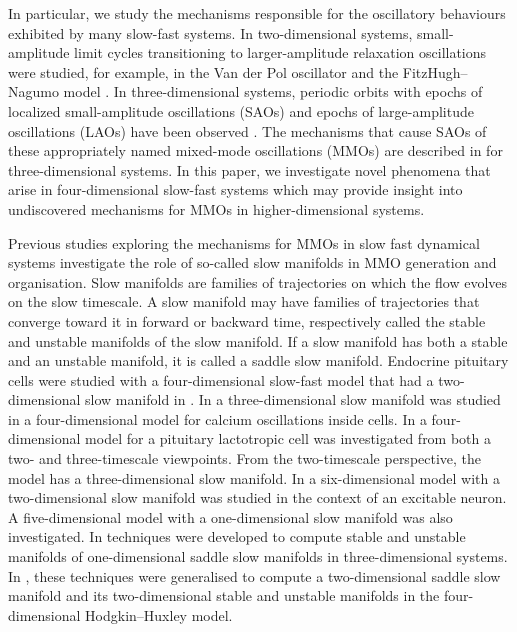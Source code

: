 \documentclass{ws-ijbc}
\begin{document}
In particular, we study the mechanisms responsible for the oscillatory behaviours exhibited by many slow-fast systems.  In two-dimensional systems, small-amplitude limit cycles transitioning to larger-amplitude relaxation oscillations were studied, for example, in the Van der Pol oscillator and the FitzHugh--Nagumo model \cite{canard_explosion, fitz-hugh-nagumo}.  In three-dimensional systems, periodic orbits with epochs of localized small-amplitude oscillations (SAOs) and epochs of large-amplitude oscillations (LAOs) have been observed \cite{BZ}.  The mechanisms that cause SAOs of these appropriately named mixed-mode oscillations (MMOs) are described in \cite{MMO} for three-dimensional systems.  In this paper, we investigate novel phenomena that arise in four-dimensional slow-fast systems which may provide insight into undiscovered mechanisms for MMOs in higher-dimensional systems.

Previous studies exploring the mechanisms for MMOs in slow fast dynamical systems investigate the role of so-called slow manifolds in MMO generation and organisation.  Slow manifolds are families of trajectories on which the flow evolves on the slow timescale.  A slow manifold may have families of trajectories that converge toward it in forward or backward time, respectively called the stable and unstable manifolds of the slow manifold.  If a slow manifold has both a stable and an unstable manifold, it is called a saddle slow manifold.  Endocrine pituitary cells were studied with a four-dimensional slow-fast model that had a two-dimensional slow manifold in \cite{Vo_paper2}.  In \cite{Emily_Harvey_paper} a three-dimensional slow manifold was studied in a four-dimensional model for calcium oscillations inside cells. In \cite{Vo_paper} a four-dimensional model for a pituitary lactotropic cell was investigated from both a two- and three-timescale viewpoints.  From the two-timescale perspective, the model has a three-dimensional slow manifold.  In \cite{Martin_neuron_paper} a six-dimensional model with a two-dimensional slow manifold was studied in the context of an excitable neuron.  A five-dimensional model with a one-dimensional slow manifold was also investigated.  In \cite{Saeed_Paper} techniques were developed to compute stable and unstable manifolds of one-dimensional saddle slow manifolds in three-dimensional systems. In \cite{Cris_paper}, these techniques were generalised to compute a two-dimensional saddle slow manifold and its two-dimensional stable and unstable manifolds in the four-dimensional Hodgkin--Huxley model.
\end{document}
